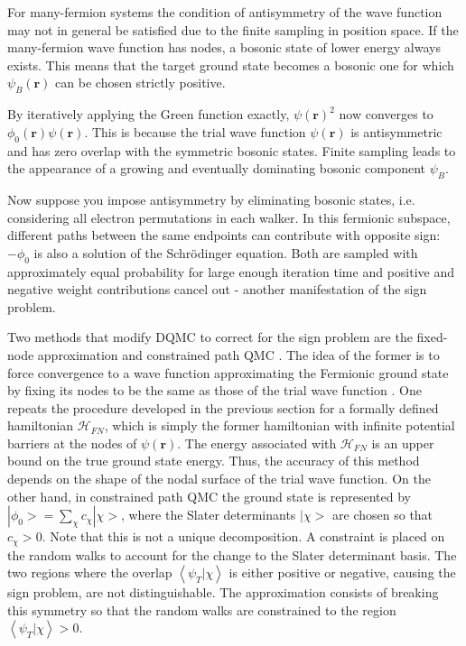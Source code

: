 For many-fermion systems the condition of antisymmetry of the wave function may not in general be satisfied due to the finite sampling in position space. If the many-fermion wave function has nodes, a bosonic state of lower energy always exists. This means that the target ground state becomes a bosonic one for which $\psi_{B}(\bm r)$ can be chosen strictly positive.\par

By iteratively applying the Green function exactly, $\psi (\bm r)^2$ now converges to $\phi_0(\bm r) \psi (\bm r)$. This is because the trial wave function $\psi (\bm r) $ is antisymmetric and has zero overlap with the symmetric bosonic states. Finite sampling leads to the appearance of a growing and eventually dominating bosonic component $\psi_B$.\par

Now suppose you impose antisymmetry by eliminating bosonic states, i.e. considering all electron permutations in each walker. In this fermionic subspace, different paths between the same endpoints can contribute with opposite sign: $-\phi_0 $ is also a solution of the Schr\"odinger equation. Both are sampled with approximately equal probability for large enough iteration time and positive and negative weight contributions cancel out - another manifestation of the sign problem.\par

Two methods that modify DQMC to correct for the sign problem are the fixed-node approximation \cite{constrained2,vmc_review} and constrained path QMC \cite{constrained, constrained2}. The idea of the former is to force convergence to a wave function approximating the Fermionic ground state by fixing its nodes to be the same as those of the trial wave function \cite{vmc_review}. One repeats the procedure developed in the previous section for a formally defined hamiltonian $\mathcal{H}_{FN}$, which is simply the former hamiltonian with infinite potential barriers at the nodes of $\psi (\bm r)$. The energy associated with $\mathcal{H}_{FN}$ is an upper bound on the true ground state energy. Thus, the accuracy of this method depends on the shape of the nodal surface of the trial wave function. On the other hand, in constrained path QMC the ground state is represented by $|\phi_0 > = \sum_\chi c_\chi |\chi >$, where the Slater determinants $|\chi> $ are chosen so that $c_\chi > 0$. Note that this is not a unique decomposition. A constraint is placed on the random walks to account for the change to the Slater determinant basis. The two regions where the overlap $\left \langle \psi_T | \chi \right\rangle $ is either positive or negative, causing the sign problem, are not distinguishable. The approximation consists of breaking this symmetry so that the random walks are constrained to the region $\left \langle \psi_T | \chi \right\rangle > 0$.

